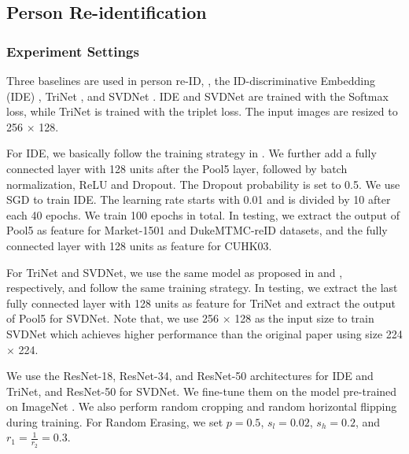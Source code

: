 \documentclass[10pt,twocolumn,letterpaper]{article}
\begin{document}
\subsection{Person Re-identification}



\subsubsection{Experiment Settings}
Three baselines are used in person re-ID, \ie, the ID-discriminative Embedding (IDE) \cite{reid-survey}, TriNet \cite{hermans2017defense}, and SVDNet \cite{sun2017svdnet}. IDE and SVDNet are trained with the Softmax loss, while TriNet is trained with the triplet loss. The input images are resized to 256 $\times$ 128. 

For IDE, we basically follow the training strategy in \cite{reid-survey}. We further add a fully connected layer with 128 units after the Pool5 layer, followed by batch normalization, ReLU and Dropout. The Dropout probability is set to 0.5. We use SGD to train IDE. The learning rate starts with 0.01 and is divided by 10 after each 40 epochs. We train 100 epochs in total. In testing, we extract the output of Pool5 as feature for Market-1501 and DukeMTMC-reID datasets, and the fully connected layer with 128 units as feature for CUHK03. 

For TriNet and SVDNet, we use the same model as proposed in \cite{hermans2017defense} and \cite{sun2017svdnet}, respectively, and follow the same training strategy. In testing, we extract the last fully connected layer with 128 units as feature for TriNet and extract the output of Pool5 for SVDNet. Note that, we use 256 $\times$ 128 as the input size to train SVDNet which achieves higher performance than the original paper using size 224 $\times$ 224.

We use the ResNet-18, ResNet-34, and ResNet-50 architectures for IDE and TriNet, and ResNet-50 for SVDNet. We fine-tune them on the model pre-trained on ImageNet \cite{deng2009imagenet}. We also perform random cropping and random horizontal flipping during training. For Random Erasing, we set $p = 0.5$, $s_l = 0.02$, $s_h = 0.2$, and $r_1 = \frac{1}{r_2} = 0.3$.
\end{document}
